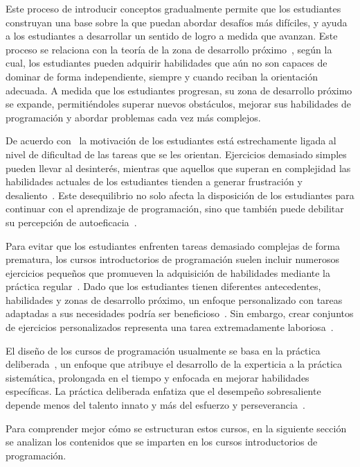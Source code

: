 Este proceso de introducir conceptos gradualmente permite que los estudiantes construyan una base sobre la que puedan abordar desafíos más difíciles, y ayuda a los estudiantes a desarrollar un sentido de logro a medida que avanzan. Este proceso se relaciona con la teoría de la zona de desarrollo próximo~\cite{vygotsky1978mind}, según la cual, los estudiantes pueden adquirir habilidades que aún no son capaces de dominar de forma independiente, siempre y cuando reciban la orientación adecuada. A medida que los estudiantes progresan, su zona de desarrollo próximo se expande, permitiéndoles superar nuevos obstáculos, mejorar sus habilidades de programación y abordar problemas cada vez más complejos.

De acuerdo con~\cite{rosenzweig2019expectancy} la motivación de los estudiantes está estrechamente ligada al nivel de dificultad de las tareas que se les orientan. Ejercicios demasiado simples pueden llevar al desinterés, mientras que aquellos que superan en complejidad las habilidades actuales de los estudiantes tienden a generar frustración y desaliento~\cite{rosenzweig2019expectancy}. Este desequilibrio no solo afecta la disposición de los estudiantes para continuar con el aprendizaje de programación, sino que también puede debilitar su percepción de autoeficacia~\cite{bandura1977self}.

Para evitar que los estudiantes enfrenten tareas demasiado complejas de forma prematura, los cursos introductorios de programación suelen incluir numerosos ejercicios pequeños que promueven la adquisición de habilidades mediante la práctica regular~\cite{allen2018msp, vihavainen2011extreme}. Dado que los estudiantes tienen diferentes antecedentes, habilidades y zonas de desarrollo próximo, un enfoque personalizado con tareas adaptadas a sus necesidades podría ser beneficioso~\cite{leinonen2021exploring}. Sin embargo, crear conjuntos de ejercicios personalizados representa una tarea extremadamente laboriosa~\cite{lobb2016coderunner, wrenn2018whotests}.

El diseño de los cursos de programación usualmente se basa en la práctica deliberada~\cite{ericsson1993deliberate}, un enfoque que atribuye el desarrollo de la experticia a la práctica sistemática, prolongada en el tiempo y enfocada en mejorar habilidades específicas. La práctica deliberada enfatiza que el desempeño sobresaliente depende menos del talento innato y más del esfuerzo y perseverancia~\cite{duckworth2013true}.

Para comprender mejor cómo se estructuran estos cursos, en la siguiente sección se analizan los contenidos que se imparten en los cursos introductorios de programación.


